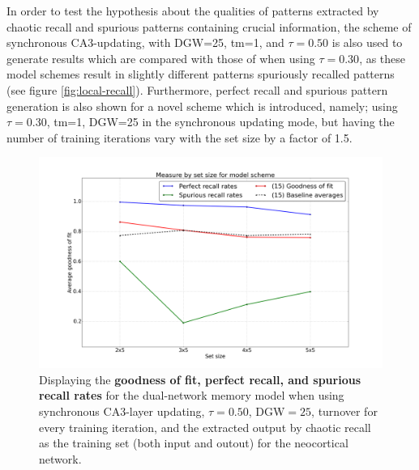 
In order to test the hypothesis about the qualities of patterns extracted by chaotic recall and spurious patterns containing crucial information, the scheme of synchronous CA3-updating, with DGW=25, tm=1, and $\tau=0.50$ is also used to generate results which are compared with those of when using $\tau=0.30$, as these model schemes result in slightly different patterns spuriously recalled patterns (see figure \ref{fig:local-recall}). Furthermore, perfect recall and spurious pattern generation is also shown for a novel scheme which is introduced, namely; using $\tau=0.30$, tm=1, DGW=25 in the synchronous updating mode, but having the number of training iterations vary with the set size by a factor of 1.5.



\begin{figure}
    \centering
    \includegraphics[width=13cm]{fig/hypothesis-test-sync/combined-measures-sync-tr50-tm1-dgw25}
    \caption{Displaying the \textbf{goodness of fit, perfect recall, and spurious recall rates} for the dual-network memory model when using synchronous CA3-layer updating, $\tau=0.50$, DGW$=25$, turnover for every training iteration, and the extracted output by chaotic recall as the training set (both input and outout) for the neocortical network.}
    \label{fig:combined-measures-sync-tr50-tm1-dgw25}
\end{figure}

